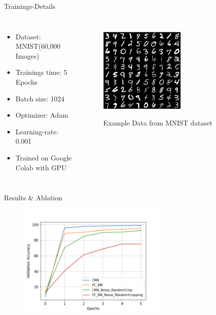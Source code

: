 \documentclass[citestyle=authoryear,bibstyle=numeric,hyperref,backend=biber]{sdqbeamer}
\begin{document}
\begin{frame}{Trainings-Details}
    \begin{columns}
        \begin{itemize}
            \item Dataset: MNIST(60,000 Images)
            \item Trainings time: 5 Epochs
            \item Batch size: 1024
            \item Optimizer: Adam
            \item Learning-rate: 0.001
            \item Trained on Google Colab with GPU
        \end{itemize}

        \begin{figure}
            \centering
            \includegraphics[width=0.6\textwidth]{pictures/mnist.png}
            \label{fig:mnist}
            \caption{Example Data from MNIST dataset}
        \end{figure}
    \end{columns}
\end{frame}

\begin{frame}{Results \& Ablation}
    \vspace{-40pt}
    \begin{figure}
        \includegraphics[width=0.65\textwidth]{pictures/val_acc_result_data.png}
    \end{figure}
\end{frame}
\end{document}

